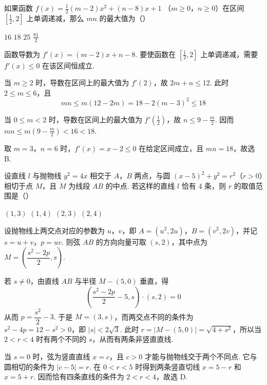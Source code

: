 \begin{problem}
如果函数 \( f(x) = \frac{1}{2} (m - 2)x^2 + (n - 8)x + 1  \) （\(m \geqslant 0\)，\(n \geqslant 0\)）在区间 \(\left[\frac{1}{2}, 2\right]\) 上单调递减，那么 \( mn \) 的最大值为（\quad）

\choices
    {\(16\)}
    {\(18\)}
    {\(25\)}
    {\(\frac{81}{2}\)}


\begin{solution}
函数导数为 \(f'(x)=(m-2)x+n-8\). 要使函数在 \(\left[\frac12,2\right]\) 上单调递减，需要 \(f'(x)\leqslant0\) 在该区间恒成立.

当 \(m\geqslant2\) 时，导数在区间上的最大值为 \(f'(2)\)，故 \(2m+n\leqslant12\). 此时 \(2\leqslant m\leqslant6\)，且
\[
mn\leqslant m(12-2m)=18-2(m-3)^2\leqslant18
\]

当 \(0\leqslant m<2\) 时，导数在区间上的最大值为 \(f'\left(\frac12\right)\)，故 \(n\leqslant9-\frac m2\). 因而 \(mn\leqslant m\left(9-\frac m2\right)<16<18\).

取 \(m=3\)，\(n=6\) 时，\(f'(x)=x-2\leqslant0\) 在给定区间成立，且 \(mn=18\)，故选 B.
\end{solution}
\end{problem}

\begin{problem}
设直线 \(l\) 与抛物线 \(y^{2} = 4x\) 相交于 \(A\)，\(B\) 两点，与圆 \((x - 5)^{2} + y^{2} = r^{2}\)（\(r > 0\)）相切于点 \(M\)，且 \(M\) 为线段 \(AB\) 的中点. 若这样的直线 \(l\) 恰有 4 条，则 \(r\) 的取值范围是（\quad）

\choices
    {\((1,3)\)}
    {\((1,4)\)}
    {\((2,3)\)}
    {\((2,4)\)}


\begin{solution}
设抛物线上两交点对应的参数为 \(u\)，\(v\)，即 \(A=(u^2,2u)\)，\(B=(v^2,2v)\)，并记 \(s=u+v\)，\(p=uv\). 则弦 \(AB\) 的方向向量可取 \((s,2)\)，其中点为 \(M=\left(\dfrac{s^2-2p}{2},s\right)\).

若 \(s\ne0\)，由直线 \(AB\) 与半径 \(M-(5,0)\) 垂直，得
\[
\left(\frac{s^2-2p}{2}-5,s\right)\cdot(s,2)=0
\]
从而 \(p=\dfrac{s^2}{2}-3\). 于是 \(M=(3,s)\)，而两交点不同的条件为 \(s^2-4p=12-s^2>0\)，即 \(\lvert s\rvert<2\sqrt3\). 此时 \(r=\lvert M-(5,0)\rvert=\sqrt{4+s^2}\)，所以当 \(2<r<4\) 时有两个不同的 \(s\)，从而有两条非竖直直线.

当 \(s=0\) 时，弦为竖直直线 \(x=c\)，且 \(c>0\) 才能与抛物线交于两个不同点. 它与圆相切的条件为 \(\lvert c-5\rvert=r\). 在 \(0<r<5\) 时得到两条竖直切线 \(x=5-r\) 和 \(x=5+r\). 因而恰有四条直线的条件为 \(2<r<4\)，故选 D.
\end{solution}
\end{problem}

